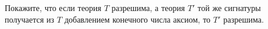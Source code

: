Покажите, что если теория $T$ разрешима, а теория $T'$ той же сигнатуры получается из $T$ добавлением
конечного числа аксиом, то $T'$ разрешима.
